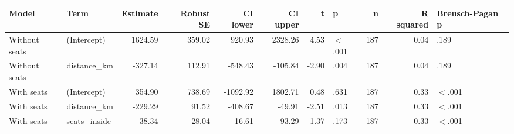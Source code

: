 \begingroup\footnotesize
\begin{tabular}{llrrrrrlrrl}
  \toprule
Model & Term & Estimate & Robust SE & CI lower & CI upper & t & p & n & R squared & Breusch-Pagan p \\ 
  \midrule
Without seats & (Intercept) & 1624.59 & 359.02 & 920.93 & 2328.26 & 4.53 & $<$.001 & 187 & 0.04 & .189 \\ 
  Without seats & distance\_km & -327.14 & 112.91 & -548.43 & -105.84 & -2.90 & .004 & 187 & 0.04 & .189 \\ 
  With seats & (Intercept) & 354.90 & 738.69 & -1092.92 & 1802.71 & 0.48 & .631 & 187 & 0.33 & $<$.001 \\ 
  With seats & distance\_km & -229.29 & 91.52 & -408.67 & -49.91 & -2.51 & .013 & 187 & 0.33 & $<$.001 \\ 
  With seats & seats\_inside & 38.34 & 28.04 & -16.61 & 93.29 & 1.37 & .173 & 187 & 0.33 & $<$.001 \\ 
   \bottomrule
\end{tabular}
\endgroup

